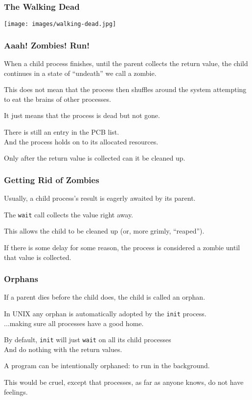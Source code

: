 \begin{frame}
	\frametitle{The Walking Dead}

	\begin{center}
		\texttt{[image: images/walking-dead.jpg]}
	\end{center}

\end{frame}



\begin{frame}
	\frametitle{Aaah! Zombies! Run!}

	When a child process finishes, until the parent collects the return value, the child continues in a state of ``undeath'' we call a \alert{zombie}.

	This does not mean that the process then shuffles around the system attempting to eat the brains of other processes.

	It just means that the process is dead but not gone.

	There is still an entry in the PCB list.\\
	\quad And the process holds on to its allocated resources.

	Only after the return value is collected can it be cleaned up.

\end{frame}

\begin{frame}
	\frametitle{Getting Rid of Zombies}

	Usually, a child process's result is eagerly awaited by its parent.

	The \texttt{wait} call collects the value right away.

	This allows the child to be cleaned up (or, more grimly, ``reaped'').

	If there is some delay for some reason, the process is considered a zombie until that value is collected.

\end{frame}


\begin{frame}
	\frametitle{Orphans}

	If a parent dies before the child does, the child is called an \alert{orphan}.

	In UNIX any orphan is automatically adopted by the \texttt{init} process.\\
	\quad ...making sure all processes have a good home.

	By default, \texttt{init} will just \texttt{wait} on all its child processes\\
	\quad And do nothing with the return values.

	A program can be intentionally orphaned: to run in the background.


	This would be cruel, except that processes, as far as anyone knows, do not have feelings.


\end{frame}


